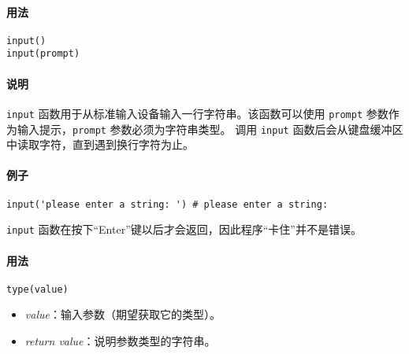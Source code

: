 \paragraph{用法}
\begin{lstlisting}[language=berry, numbers=none]
input()
input(prompt)
\end{lstlisting}

\paragraph{说明}
\texttt{input} 函数用于从标准输入设备输入一行字符串。该函数可以使用 \texttt{prompt} 参数作为输入提示，\texttt{prompt} 参数必须为字符串类型。
调用 \texttt{input} 函数后会从键盘缓冲区中读取字符，直到遇到换行字符为止。

\paragraph{例子}
\begin{lstlisting}[language=berry, numbers=none]
input('please enter a string: ') # please enter a string: 
\end{lstlisting}
\texttt{input} 函数在按下``Enter''键以后才会返回，因此程序``卡住''并不是错误。

 \label{section::baselib_type}

\paragraph{用法}
\begin{lstlisting}[language=berry, numbers=none]
type(value)
\end{lstlisting}

\begin{itemize}
    \item \emph{value}：输入参数（期望获取它的类型）。
    \item \emph{return value}：说明参数类型的字符串。
\end{itemize}

